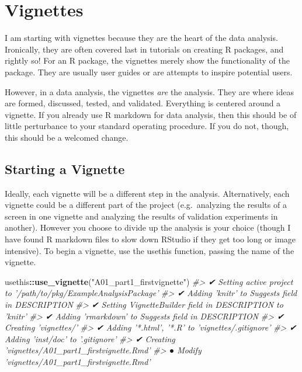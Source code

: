 \documentclass[]{book}
\newenvironment{Shaded}{\begin{snugshade}}{\end{snugshade}}
\newcommand{\CommentTok}[1]{\textcolor[rgb]{0.56,0.35,0.01}{\textit{#1}}}
\newcommand{\KeywordTok}[1]{\textcolor[rgb]{0.13,0.29,0.53}{\textbf{#1}}}
\newcommand{\NormalTok}[1]{#1}
\newcommand{\OperatorTok}[1]{\textcolor[rgb]{0.81,0.36,0.00}{\textbf{#1}}}
\newcommand{\StringTok}[1]{\textcolor[rgb]{0.31,0.60,0.02}{#1}}
\begin{document}
\hypertarget{vignettes}{%
\section{Vignettes}\label{vignettes}}

I am starting with vignettes because they are the heart of the data analysis. Ironically, they are often covered last in tutorials on creating R packages, and rightly so! For an R package, the vignettes merely show the functionality of the package. They are usually user guides or are attempts to inspire potential users.

However, in a data analysis, the vignettes \emph{are} the analysis. They are where ideas are formed, discussed, tested, and validated. Everything is centered around a vignette. If you already use R markdown for data analysis, then this should be of little perturbance to your standard operating procedure. If you do not, though, this should be a welcomed change.

\hypertarget{starting-a-vignette}{%
\subsection{Starting a Vignette}\label{starting-a-vignette}}

Ideally, each vignette will be a different step in the analysis. Alternatively, each vignette could be a different part of the project (e.g.~analyzing the results of a screen in one vignette and analyzing the results of validation experiments in another). However you choose to divide up the analysis is your choice (though I have found R markdown files to slow down RStudio if they get too long or image intensive). To begin a vignette, use the usethis function, passing the name of the vignette.

\begin{Shaded}
\begin{Highlighting}[]
\NormalTok{usethis}\OperatorTok{::}\KeywordTok{use_vignette}\NormalTok{(}\StringTok{"A01_part1_firstvignette"}\NormalTok{)}
\CommentTok{#> ✔ Setting active project to '/path/to/pkg/ExampleAnalysisPackage'}
\CommentTok{#> ✔ Adding 'knitr' to Suggests field in DESCRIPTION}
\CommentTok{#> ✔ Setting VignetteBuilder field in DESCRIPTION to 'knitr'}
\CommentTok{#> ✔ Adding 'rmarkdown' to Suggests field in DESCRIPTION}
\CommentTok{#> ✔ Creating 'vignettes/'}
\CommentTok{#> ✔ Adding '*.html', '*.R' to 'vignettes/.gitignore'}
\CommentTok{#> ✔ Adding 'inst/doc' to '.gitignore'}
\CommentTok{#> ✔ Creating 'vignettes/A01_part1_firstvignette.Rmd'}
\CommentTok{#> ● Modify 'vignettes/A01_part1_firstvignette.Rmd'}
\end{Highlighting}
\end{Shaded}
\end{document}
